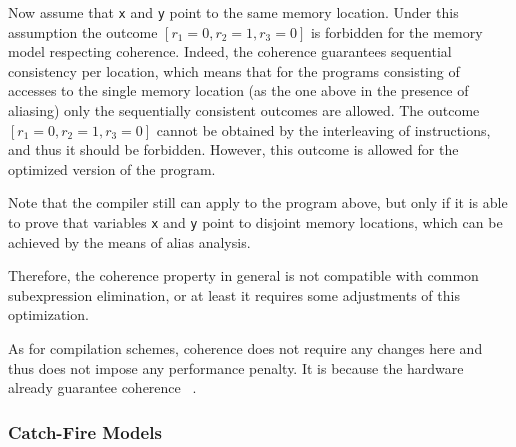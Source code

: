 Now assume that \texttt{x} and \texttt{y} point to the same memory location.
Under this assumption the outcome $[r_1=0, r_2=1, r_3=0]$
is forbidden for the memory model respecting coherence.
Indeed, the coherence guarantees sequential consistency per location, 
which means that for the programs consisting of accesses 
to the single memory location 
(as the one above in the presence of aliasing) 
only the sequentially consistent outcomes are allowed.
The outcome $[r_1=0, r_2=1, r_3=0]$ cannot be obtained 
by the interleaving of instructions, and thus 
it should be forbidden.  
However, this outcome is allowed for 
the optimized version of the program. 

Note that the compiler still can apply \CSE to the program above, 
but only if it is able to prove that variables \texttt{x} and \texttt{y} 
point to disjoint memory locations, which can be achieved 
by the means of alias analysis.  

Therefore, the coherence property in general is not compatible 
with common subexpression elimination, or at least 
it requires some adjustments of this optimization.

As for compilation schemes, coherence does not require 
any changes here and thus does not impose any performance penalty.
It is because the hardware already guarantee coherence%
~\cite{Alglave-al:TOPLAS14, Sarkar-al:PLDI11, Sewell-al:CACM10, Lahav-al:PLDI17}. 

\subsubsection{Catch-Fire Models}
\label{sec:analysis:ub}

\todo{}